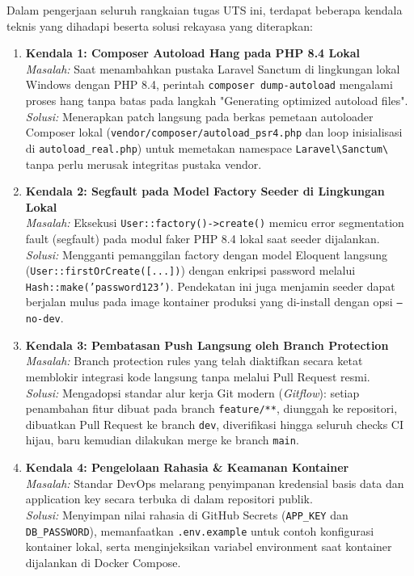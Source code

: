 \documentclass[a4paper,oneside,11pt]{book}
\begin{document}
Dalam pengerjaan seluruh rangkaian tugas UTS ini, terdapat beberapa kendala teknis yang dihadapi beserta solusi rekayasa yang diterapkan:

\begin{enumerate}
    \item \textbf{Kendala 1: Composer Autoload Hang pada PHP 8.4 Lokal} \\
    \textit{Masalah:} Saat menambahkan pustaka Laravel Sanctum di lingkungan lokal Windows dengan PHP 8.4, perintah \texttt{composer dump-autoload} mengalami proses hang tanpa batas pada langkah "Generating optimized autoload files". \\
    \textit{Solusi:} Menerapkan patch langsung pada berkas pemetaan autoloader Composer lokal (\texttt{vendor/composer/autoload\_psr4.php} dan loop inisialisasi di \texttt{autoload\_real.php}) untuk memetakan namespace \texttt{Laravel\textbackslash Sanctum\textbackslash} tanpa perlu merusak integritas pustaka vendor.
    
    \item \textbf{Kendala 2: Segfault pada Model Factory Seeder di Lingkungan Lokal} \\
    \textit{Masalah:} Eksekusi \texttt{User::factory()->create()} memicu error segmentation fault (segfault) pada modul faker PHP 8.4 lokal saat seeder dijalankan. \\
    \textit{Solusi:} Mengganti pemanggilan factory dengan model Eloquent langsung (\texttt{User::firstOrCreate([...])}) dengan enkripsi password melalui \texttt{Hash::make('password123')}. Pendekatan ini juga menjamin seeder dapat berjalan mulus pada image kontainer produksi yang di-install dengan opsi \texttt{--no-dev}.
    
    \item \textbf{Kendala 3: Pembatasan Push Langsung oleh Branch Protection} \\
    \textit{Masalah:} Branch protection rules yang telah diaktifkan secara ketat memblokir integrasi kode langsung tanpa melalui Pull Request resmi. \\
    \textit{Solusi:} Mengadopsi standar alur kerja Git modern (\textit{Gitflow}): setiap penambahan fitur dibuat pada branch \texttt{feature/**}, diunggah ke repositori, dibuatkan Pull Request ke branch \texttt{dev}, diverifikasi hingga seluruh checks CI hijau, baru kemudian dilakukan merge ke branch \texttt{main}.
    
    \item \textbf{Kendala 4: Pengelolaan Rahasia \& Keamanan Kontainer} \\
    \textit{Masalah:} Standar DevOps melarang penyimpanan kredensial basis data dan application key secara terbuka di dalam repositori publik. \\
    \textit{Solusi:} Menyimpan nilai rahasia di GitHub Secrets (\texttt{APP\_KEY} dan \texttt{DB\_PASSWORD}), memanfaatkan \texttt{.env.example} untuk contoh konfigurasi kontainer lokal, serta menginjeksikan variabel environment saat kontainer dijalankan di Docker Compose.
\end{enumerate}
\end{document}
